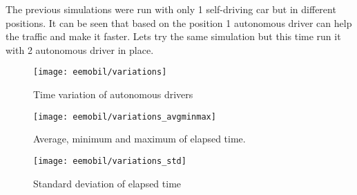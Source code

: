 		The previous simulations were run with only 1 self-driving car but in different positions. It can be seen that based on the position 1 autonomous driver can help the traffic and make it faster. Lets try the same simulation but this time run it with 2 autonomous driver in place. 
		\begin{figure}
			\centering
			\texttt{[image: eemobil/variations]}
			\caption{Time variation of autonomous drivers}
			\label{fig:self_variations}
		\end{figure}
		\begin{figure}
			\centering
			\texttt{[image: eemobil/variations\_avgminmax]}
			\caption{Average, minimum and maximum of elapsed time.}
			\label{fig:self_variations_avgminmax}
		\end{figure}
		\begin{figure}
			\centering
			\texttt{[image: eemobil/variations\_std]}
			\caption{Standard deviation of elapsed time}
			\label{fig:self_variations_std}
		\end{figure}
